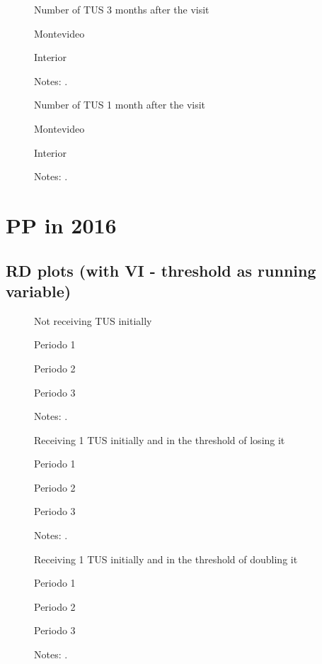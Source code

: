 \documentclass[12pt]{article}
\begin{document}
\begin{figure}[H]%
	\caption{Number of TUS 3 months after the visit}%
	\centering
	\caption*{ {Montevideo}}
	\qquad
	\caption*{Interior}
	\label{fig:first_stage_2018_tus3}%
	\caption*{ {\footnotesize Notes: .}}
\end{figure}

\begin{figure}[H]%
	\caption{Number of TUS 1 month after the visit}%
	\centering
	\caption*{ {Montevideo}}
	\qquad
	\caption*{Interior}
	\label{fig:first_stage_2018_tus1}%
	\caption*{ {\footnotesize Notes: .}}
\end{figure}

\section{PP in 2016}

\subsection{RD plots (with VI - threshold as running variable)}
\begin{figure}[H]%
	\caption{Not receiving TUS initially}%
	\centering
	\caption*{ {Periodo 1}}
	\caption*{Periodo 2}
	\qquad
	\caption*{Periodo 3}
	\label{fig:pp2016_prim_0TUS.png}%
	\caption*{ {\footnotesize Notes: .}}
\end{figure}

\begin{figure}[H]%
	\caption{Receiving 1 TUS initially and in the threshold of losing it}%
	\centering
	\caption*{ {Periodo 1}}
	\qquad
	\caption*{Periodo 2}
	\qquad
	\caption*{Periodo 3}
	\label{fig:pp2016_prim_1TUS.pdf}%
	\caption*{ {\footnotesize Notes: .}}
\end{figure}

\begin{figure}[H]%
	\caption{Receiving 1 TUS initially and in the threshold of doubling it}%
	\centering
	\caption*{ {Periodo 1}}
	\qquad
	\caption*{Periodo 2}
	\qquad
	\caption*{Periodo 3}
	\label{fig:pp2016_seg_1TUS.pdf}%
	\caption*{ {\footnotesize Notes: .}}
\end{figure}
\end{document}
